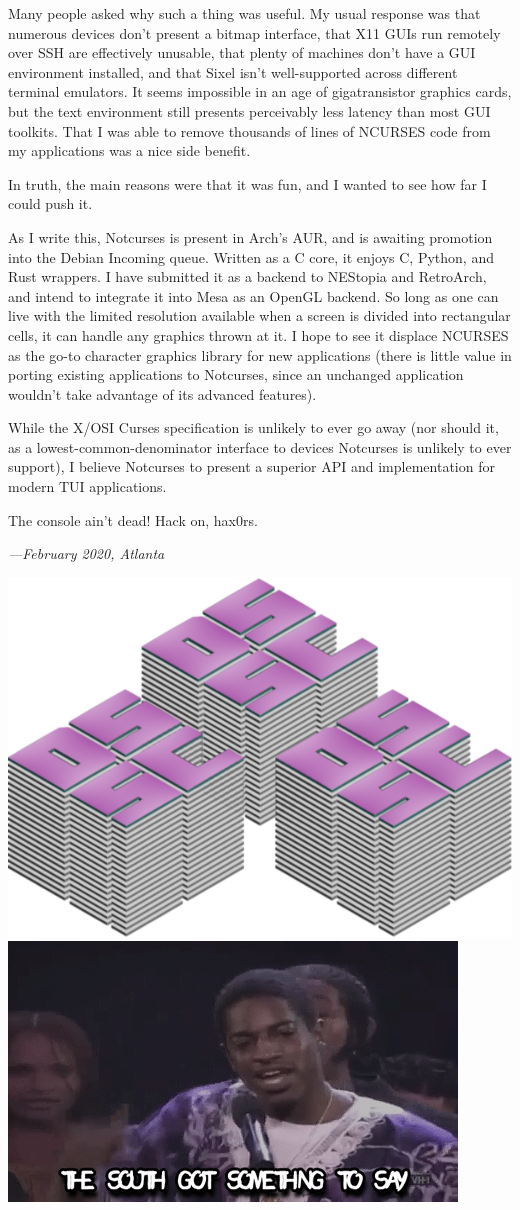 \documentclass[letterpaper,10pt]{article}
\newcommand\CC{C\nolinebreak\hspace{-.05em}\raisebox{.4ex}{\relsize{-3}{\textbf{+}}}\nolinebreak\hspace{-.10em}\raisebox{.4ex}{\relsize{-3}{\textbf{+}}}\hspace{.2em}}
\begin{document}
Many people asked why such a thing was useful. My usual response was that
numerous devices don't present a bitmap interface, that X11 GUIs run remotely
over SSH are effectively unusable, that plenty of machines don't have a GUI
environment installed, and that Sixel isn't well-supported across different
terminal emulators. It seems impossible in an age of gigatransistor graphics
cards, but the text environment still presents perceivably less latency
than most GUI toolkits. That I was able to remove thousands of lines
of NCURSES code from my applications was a nice side benefit.

In truth, the main reasons were that it was fun, and I wanted to see how far
I could push it.

As I write this, Notcurses is present in Arch's AUR, and is awaiting promotion
into the Debian Incoming queue. Written as a C core, it enjoys \CC, Python, and
Rust wrappers. I have submitted it as a backend to NEStopia and RetroArch, and
intend to integrate it into Mesa as an OpenGL backend. So long as one can live
with the limited resolution available when a screen is divided into rectangular
cells, it can handle any graphics thrown at it. I hope to see it displace
NCURSES as the go-to character graphics library for new applications (there is
little value in porting existing applications to Notcurses, since an unchanged
application wouldn't take advantage of its advanced features).

While the X/OSI Curses specification is unlikely to ever go away (nor should
it, as a lowest-common-denominator interface to devices Notcurses is unlikely
to ever support), I believe Notcurses to present a superior API and
implementation for modern TUI applications.

The console ain't dead! Hack on, hax0rs.

\flushright\textit{---February 2020, Atlanta}

\newpage

\glsaddallunused

\printglossary[title={Glossary of terms \textit{as used in this manuscript}}]

\newpage

\printbibliography
\vfill
\begin{center}
\includegraphics[width=.4\linewidth]{../common/dsscaw-purp-scaled.png}
\includegraphics[width=.5\linewidth]{../common/south.png}
\end{center}
\end{document}
